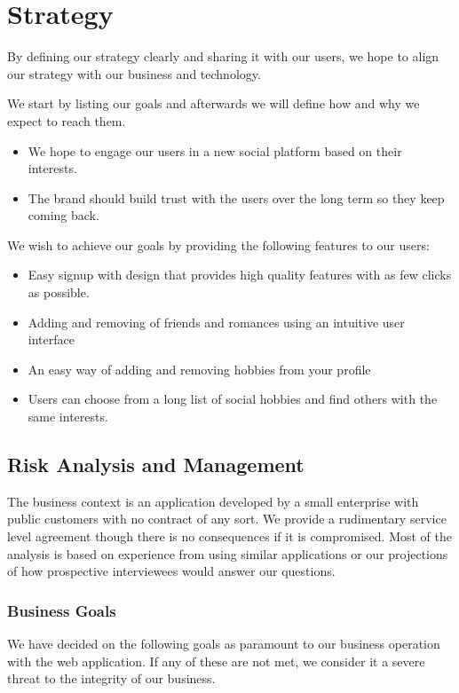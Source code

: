 \documentclass[a4paper]{article}
\begin{document}

\section{Strategy}\label{sec:strategy}
By defining our strategy clearly and sharing it with our users, we hope to align our strategy with our business and technology.

We start by listing our goals and afterwards we will define how and why we expect to reach them.

\begin{itemize}
\item
We hope to engage our users in a new social platform based on their interests.
\item
The brand should build trust with the users over the long term so they keep coming back.
\end{itemize}

We wish to achieve our goals by providing the following features to our users:
\begin{itemize}
\item Easy signup with design that provides high quality features with as few clicks as possible.
\item Adding and removing of friends and romances using an intuitive user interface
\item An easy way of adding and removing hobbies from your profile
\item Users can choose from a long list of social hobbies and find others with the same interests.
\end{itemize}

\subsection{Risk Analysis and Management}
The business context is an application developed by a small enterprise with public customers with no contract of any sort. We provide a rudimentary service level agreement though there is no consequences if it is compromised. Most of the analysis is based on experience from using similar applications or our projections of how prospective interviewees would answer our questions.
\subsubsection{Business Goals}
We have decided on the following goals as paramount to our business operation with the web application. If any of these are not met, we consider it a severe threat to the integrity of our business.
\end{document}
